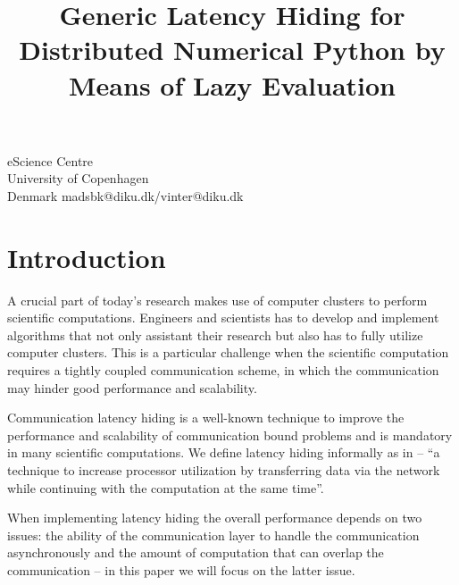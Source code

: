 \documentclass[preprint]{../PGAS10/sigplanconf}
\begin{document}


\title{Generic Latency Hiding for Distributed Numerical Python by Means of Lazy Evaluation}

           {eScience Centre\\ University of Copenhagen\\ Denmark}
           {madsbk@diku.dk/vinter@diku.dk}

\maketitle

\begin{abstract}

\end{abstract}

\section{Introduction}
A crucial part of today’s research makes use of computer clusters to perform scientific computations. Engineers and scientists has to develop and implement algorithms that not only assistant their research but also has to fully utilize computer clusters. This is a particular challenge when the scientific computation requires a tightly coupled communication scheme, in which the communication may hinder good performance and scalability.

Communication latency hiding is a well-known technique to improve the performance and scalability of communication bound problems and is mandatory in many scientific computations. We define latency hiding informally as in \cite{Strumpen94latencyhiding} -- ``a technique to increase processor utilization by transferring data via the network while continuing with the computation at the same time''.

When implementing latency hiding the overall performance depends on two issues: the ability of the communication layer to handle the communication asynchronously and the amount of computation that can overlap the communication -- in this paper we will focus on the latter issue.
\end{document}
